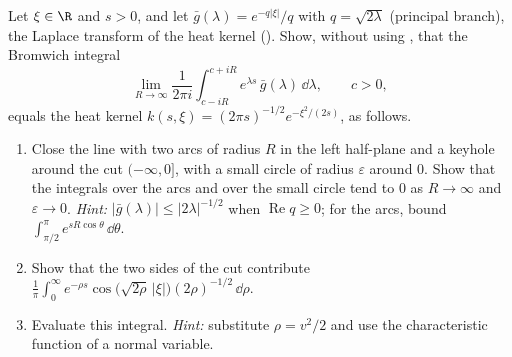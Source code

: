 \begin{exercise}\label{ex:bsf-bromwich}
\hard Let $\xi\in\R$ and $s>0$, and let $\bar g(\lambda)=e^{-q|\xi|}/q$ with $q=\sqrt{2\lambda}$ (principal branch),
the Laplace transform of the heat kernel (). Show, without using
, that the Bromwich integral
\[
  \lim_{R\to\infty}\frac1{2\pi i}\int_{c-iR}^{c+iR}e^{\lambda s}\,\bar g(\lambda)\,\dd\lambda,\qquad c>0,
\]
equals the heat kernel $k(s,\xi)=(2\pi s)^{-1/2}e^{-\xi^2/(2s)}$, as follows.
\begin{enumerate}[label=(\alph*)]
  \item Close the line with two arcs of radius $R$ in the left half-plane and a keyhole around the cut
    $(-\infty,0]$, with a small circle of radius $\varepsilon$ around $0$. Show that the integrals over the
    arcs and over the small circle tend to $0$ as $R\to\infty$ and $\varepsilon\to0$. \emph{Hint:}
    $|\bar g(\lambda)|\le|2\lambda|^{-1/2}$ when $\operatorname{Re}q\ge0$; for the arcs, bound
    $\int_{\pi/2}^{\pi}e^{sR\cos\theta}\,\dd\theta$.
  \item Show that the two sides of the cut contribute
    $\frac1\pi\int_0^\infty e^{-\rho s}\cos\big(\sqrt{2\rho}\,|\xi|\big)(2\rho)^{-1/2}\,\dd\rho$.
  \item Evaluate this integral. \emph{Hint:} substitute $\rho=v^2/2$ and use the characteristic function of
    a normal variable.
\end{enumerate}
\end{exercise}

